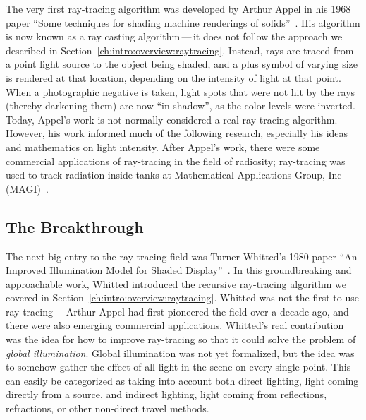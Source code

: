 The very first ray-tracing algorithm was developed by Arthur Appel in his 1968 paper ``Some techniques for shading machine renderings of solids''~\cite{appel1968some}.
His algorithm is now known as a ray casting algorithm\,---\,it does not follow the approach we described in Section~\ref{ch:intro:overview:raytracing}.
Instead, rays are traced from a point light source to the object being shaded, and a plus symbol of varying size is rendered at that location, depending on the intensity of light at that point.
When a photographic negative is taken, light spots that were not hit by the rays (thereby darkening them) are now ``in shadow'', as the color levels were inverted.
Today, Appel's work is not normally considered a real ray-tracing algorithm.
However, his work informed much of the following research, especially his ideas and mathematics on light intensity.
After Appel's work, there were some commercial applications of ray-tracing in the field of radiosity; ray-tracing was used to track radiation inside tanks at Mathematical Applications Group, Inc (MAGI)~\cite{whitted2018explains}.

\subsection{The Breakthrough}
\label{ch:relatedwork:discovery:breakthrough}

The next big entry to the ray-tracing field was Turner Whitted's 1980 paper ``An Improved Illumination Model for Shaded Display''~\cite{whitted1980improved}.
In this groundbreaking and approachable work, Whitted introduced the recursive ray-tracing algorithm we covered in Section~\ref{ch:intro:overview:raytracing}.
Whitted was not the first to use ray-tracing\,---\,Arthur Appel had first pioneered the field over a decade ago, and there were also emerging commercial applications.
Whitted's real contribution was the idea for how to improve ray-tracing so that it could solve the problem of {\it global illumination}.
Global illumination was not yet formalized, but the idea was to somehow gather the effect of all light in the scene on every single point.
This can easily be categorized as taking into account both direct lighting, light coming directly from a source, and indirect lighting, light coming from reflections, refractions, or other non-direct travel methods.

